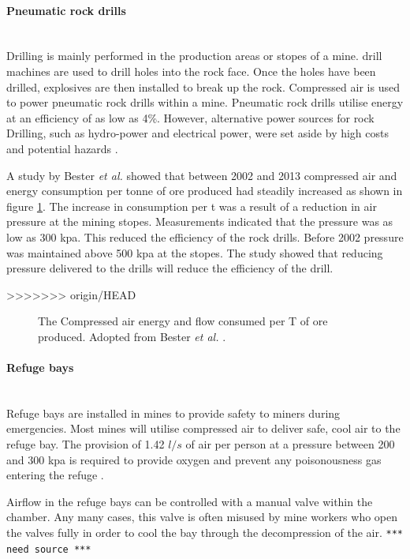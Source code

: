 	\paragraph*{Pneumatic rock drills}\leavevmode\\
	 Drilling is mainly performed in the production areas or stopes of a mine. drill machines are used to drill holes into the rock face. Once the holes have been drilled, explosives are then installed to break up the rock. Compressed air is used to power pneumatic rock drills within a mine. Pneumatic rock drills utilise energy at an efficiency of as low as 4\%. However, alternative power sources for rock Drilling, such as hydro-power and electrical power, were set aside by high costs and potential hazards \cite{van2008development}.
	\par 
	 A study by  Bester \textit{et al.} showed that between 2002 and 2013 compressed air and energy consumption per tonne of ore produced had steadily increased as shown in figure \ref{fig: Compressed energy and air flow per ton}. The increase in consumption per \gls{t} was a result of a reduction in air pressure at the mining stopes. Measurements indicated that the pressure was as low as 300 \gls{kpa}. This reduced the efficiency of the rock drills. Before 2002 pressure was maintained above 500 \gls{kpa} at the stopes.  The study showed that reducing pressure delivered to the drills will reduce the efficiency of the drill.\cite{bester2013effect} \par
>>>>>>> origin/HEAD
	\begin{figure}[h]
	\centering
	\fbox{}
	\caption[The Compressed air energy and flow consumed per T of ore produced.]{The Compressed air energy and flow consumed per T of ore produced. Adopted from Bester \textit{et al.} \cite{bester2013effect}.}
	\label{fig: Compressed energy and air flow per ton}
	\end{figure}
	\paragraph{Refuge bays}\leavevmode\\
	Refuge bays are installed in mines to provide safety to miners during emergencies. Most mines will utilise compressed air to deliver safe, cool air to the refuge bay. The provision of 1.42 $l/s$ of air per person at a pressure between 200 and 300 \gls{kpa} is required to provide oxygen and prevent any poisonousness gas entering the refuge \cite{brake1999criteria}.\par
	Airflow in the refuge bays can be controlled with a manual valve within the chamber. Any many cases, this valve is often misused by mine workers who open the valves fully in order to cool the bay through the decompression of the air. \texttt{*** need source ***}
